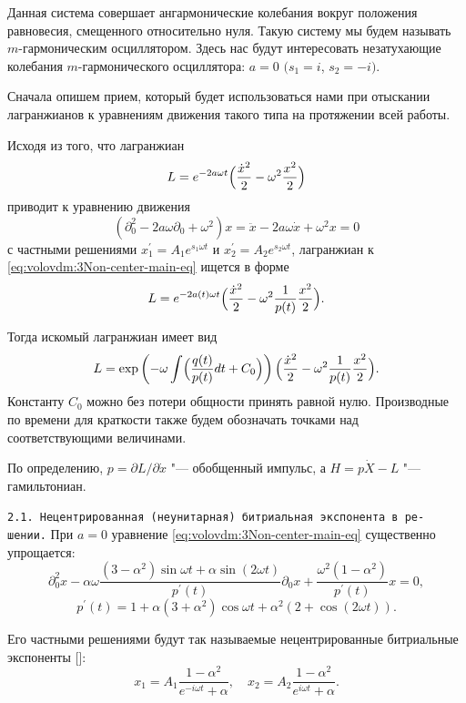 Данная система совершает ангармонические колебания вокруг положения
равновесия, смещенного относительно нуля. Такую систему мы будем называть
$m$-гармоническим осциллятором. Здесь нас будут интересовать незатухающие
колебания $m$-гармонического осциллятора: $a=0$  $(s_{1}=i$, $s_{2}=-i)$.

\smallskip

Сначала опишем прием, который будет использоваться нами при отыскании лагранжианов к уравнениям движения такого типа на протяжении всей работы.

Исходя из того, что лагранжиан
\[
L=e^{-2a\omega t}\Bigl(\frac{\dot{x}^{2}}{2}-\omega^{2}\frac{x^{2}}{2}\Bigr)
\]
приводит к уравнению движения
\[
(\partial_{0}^{2}-2a\omega\partial_{0}+\omega^{2})x=\ddot{x}-2a\omega\dot{x}+\omega^{2}x=0
\]
с частными решениями $x_{1}^{\prime}=A_{1}e^{s_{1}\omega t}$ и $x_{2}^{\prime}=A_{2}e^{s_{2}\omega t}$,
лагранжиан к \eqref{eq:volovdm:3Non-center-main-eq} ищется в форме
\[
L=e^{-2a(t)\omega t}\Bigl(\frac{\dot{x}^{2}}{2}-\omega^{2}\frac{1}{p(t)}\frac{x^{2}}{2}\Bigr).
\]


Тогда искомый лагранжиан имеет вид
\[
L=\exp\left(-\omega\int\Bigl(\frac{q(t)}{p(t)}dt+C_{0}\Bigr)\right)\Bigl(\frac{\dot{x}^{2}}{2}-\omega^{2}\frac{1}{p(t)}\frac{x^{2}}{2}\Bigr).
\]
Константу $C_{0}$ можно без потери общности принять равной нулю.
Производные по времени для краткости также будем обозначать точками
над соответствующими величинами.

По определению, $p={\partial L}/{\partial\dot{x}}$ "--- обобщенный импульс,
а $H=p\dot{X}-L$ "--- гамильтониан.

\pagebreak


\texttt{2.1. Нецентрированная (неунитарная) битриальная экспонента в ре-} \linebreak \texttt{шении.}
При $a=0$ уравнение \eqref{eq:volovdm:3Non-center-main-eq} существенно
упрощается:
\begin{equation}
\partial_{0}^{2}x-\alpha\omega\dfrac{\left(3-\alpha^{2}\right)\sin\omega t+\alpha\sin (2\omega t) }{ p^{\prime}(t)} \partial_{0}x+\dfrac{\omega^{2}\left(1-\alpha^{2}\right)}{p^{\prime}(t)} x=0,\label{eq:volovdm:3Non-center}
\end{equation}
\[
p^{\prime}(t)=1+\alpha\left(3+\alpha^{2}\right)\cos\omega t+\alpha^{2}\left(2+\cos (2\omega t) \right).
\]


Его частными решениями будут так называемые нецентрированные битриальные
экспоненты {[]}:
\[
x_{1}=A_{1}\dfrac{1-\alpha^{2}}{e^{-i\omega t}+\alpha}, \quad  x_{2}=A_{2}\dfrac{1-\alpha^{2}}{e^{i\omega t}+\alpha}.
\]


